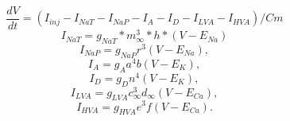 \begin{equation}
\frac{dV}{dt} = (I_{inj} - I_{NaT} - I_{NaP} - I_{A} - I_{D} - I_{LVA} - I_{HVA})/Cm
\end{equation}
\begin{equation}
I_{NaT} = g_{NaT} * m_{\infty}^3 * h * (V - E_{Na})
\end{equation}
\begin{equation}
I_{NaP} = g_{NaP} r^3 (V - E_{Na}),
\end{equation}
\begin{equation}
I_{A} = g_{A} a^4 b (V - E_{K}),
\end{equation}
\begin{equation}
I_{D} = g_{D} n^4 (V - E_{K}),
\end{equation}
\begin{equation}
I_{LVA} = g_{LVA} c_{{\infty}}^3 d_{{\infty}} (V - E_{Ca}),
\end{equation}
\begin{equation}
I_{HVA} = g_{HVA} e^3 f (V - E_{Ca}).
\label{eq:channels}
\end{equation}
